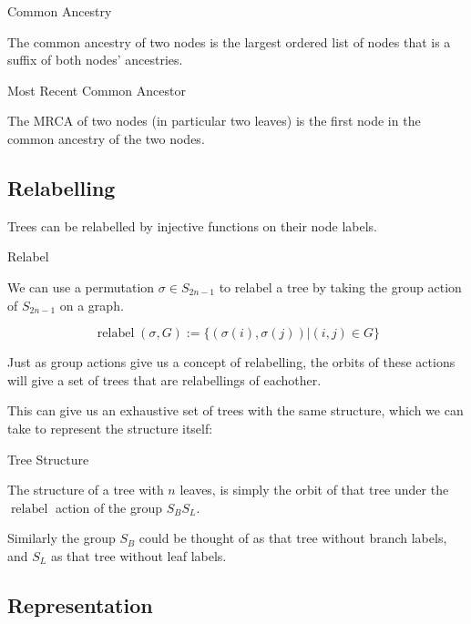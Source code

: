 \documentclass{report}
\begin{document}
\begin{definition} Common Ancestry

	The common ancestry of two nodes is the largest ordered list of nodes that is a suffix of both nodes' ancestries.
\end{definition}

\begin{definition} Most Recent Common Ancestor

	The MRCA of two nodes (in particular two leaves) is the first node in the common ancestry of the two nodes.
\end{definition}


\subsection{Relabelling}

Trees can be relabelled by injective functions on their node labels.

\DeclareMathOperator{\relabel}{relabel}

\begin{definition} Relabel

	We can use a permutation $\sigma \in S_{2n-1}$ to relabel a tree by taking the group action of $S_{2n-1}$ on a graph.

	\[
		\relabel(\sigma, G) := \{(\sigma(i), \sigma(j)) | (i, j) \in G\}
	\]
\end{definition}

Just as group actions give us a concept of relabelling, the orbits of these actions will give a set of trees that are relabellings of eachother.

This can give us an exhaustive set of trees with the same structure, which we can take to represent the structure itself:

\begin{definition} Tree Structure

	The structure of a tree with $n$ leaves, is simply the orbit of that tree under the $\relabel$ action of the group $S_BS_L$.

	Similarly the group $S_B$ could be thought of as that tree without branch labels, and $S_L$ as that tree without leaf labels.
\end{definition}

\subsection{Representation}
\end{document}
